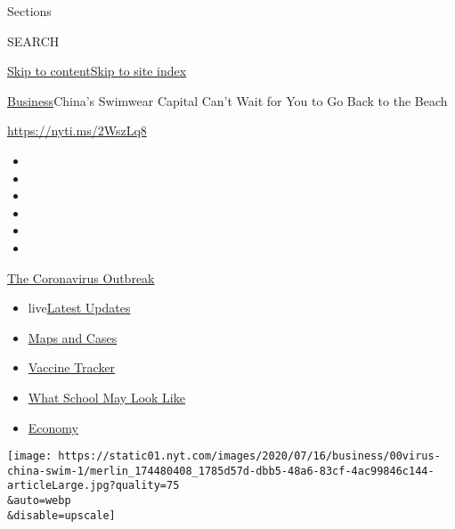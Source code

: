 Sections

SEARCH

\protect\hyperlink{site-content}{Skip to
content}\protect\hyperlink{site-index}{Skip to site index}

\href{/section/business}{Business}\textbar{}China's Swimwear Capital
Can't Wait for You to Go Back to the Beach

\url{https://nyti.ms/2WszLq8}

\begin{itemize}
\item
\item
\item
\item
\item
\item
\end{itemize}

\href{https://www.nytimes.com/news-event/coronavirus?action=click\&pgtype=Article\&state=default\&region=TOP_BANNER\&context=storylines_menu}{The
Coronavirus Outbreak}

\begin{itemize}
\tightlist
\item
  live\href{https://www.nytimes.com/2020/08/01/world/coronavirus-covid-19.html?action=click\&pgtype=Article\&state=default\&region=TOP_BANNER\&context=storylines_menu}{Latest
  Updates}
\item
  \href{https://www.nytimes.com/interactive/2020/us/coronavirus-us-cases.html?action=click\&pgtype=Article\&state=default\&region=TOP_BANNER\&context=storylines_menu}{Maps
  and Cases}
\item
  \href{https://www.nytimes.com/interactive/2020/science/coronavirus-vaccine-tracker.html?action=click\&pgtype=Article\&state=default\&region=TOP_BANNER\&context=storylines_menu}{Vaccine
  Tracker}
\item
  \href{https://www.nytimes.com/interactive/2020/07/29/us/schools-reopening-coronavirus.html?action=click\&pgtype=Article\&state=default\&region=TOP_BANNER\&context=storylines_menu}{What
  School May Look Like}
\item
  \href{https://www.nytimes.com/live/2020/07/31/business/stock-market-today-coronavirus?action=click\&pgtype=Article\&state=default\&region=TOP_BANNER\&context=storylines_menu}{Economy}
\end{itemize}

\texttt{[image: https://static01.nyt.com/images/2020/07/16/business/00virus-china-swim-1/merlin\_174480408\_1785d57d-dbb5-48a6-83cf-4ac99846c144-articleLarge.jpg?quality=75\\\&auto=webp\\\&disable=upscale]}

